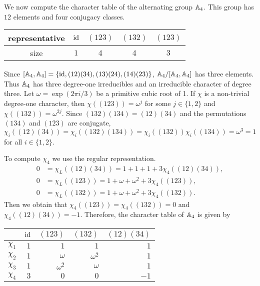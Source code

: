 \begin{example}
	We now compute the character table of the alternating group $\mathbb{A}_4$. This group has $12$ 
	elements and four conjugacy classes.
	\begin{center}
		\begin{tabular}{c|cccc}
			representative & $\operatorname{id}$ & $(123)$ & $(132)$ & $(123)$\tabularnewline
			\hline
			size & $1$ & $4$ & $4$ & $3$ 
		\end{tabular}
	\end{center}
	Since $[\mathbb{A}_4,\mathbb{A}_4]=\{\operatorname{id},(12)(34),(13)(24),(14)(23)\}$,
	$\mathbb{A}_4/[\mathbb{A}_4,\mathbb{A}_4]$ has three elements. Thus $\mathbb{A}_4$ has three degree-one irreducibles and
	an irreducible character of degree three. Let 
	$\omega=\exp(2\pi i/3)$ be a primitive cubic root of 1. If $\chi$
	is a non-trivial degree-one character, then 
	$\chi\left( (123) \right)=\omega^j$
	for some $j\in\{1,2\}$ and $\chi\left( (132) \right)=\omega^{2j}$. Since 
	$(132)(134)=(12)(34)$ and 
	the permutations $(134)$ and $(123)$ are conjugate,  
	\[
	\chi_i((12)(34))=\chi_i((132)(134))=\chi_i((132))\chi_i((134))=\omega^3=1
	\]
	for all $i\in\{1,2\}$. 
	
	To compute $\chi_4$ we use the regular representation. 
	\begin{align*}
		0&=\chi_L\left( (12)(34) \right)=1+1+1+3\chi_4\left( (12)(34) \right),\\
		0&=\chi_L\left( (123) \right)=1+\omega+\omega^2+3\chi_4\left( (123) \right),\\
		0&=\chi_L\left( (132) \right)=1+\omega+\omega^2+3\chi_4\left( (132) \right).
	\end{align*}
	Then we obtain that $\chi_4\left( (123) \right)=\chi_4\left( (132)
	\right)=0$ and $\chi_4\left( (12)(34) \right)=-1$. Therefore, the character table of $\mathbb{A}_4$
	is given by
	\begin{center}
		\begin{tabular}{|c|rrrr|}
			\hline
			& $\operatorname{id}$ & $(123)$ & $(132)$ & $(12)(34)$\tabularnewline
			\hline
			$\chi_1$ & $1$ & $1$ & $1$ & $1$\tabularnewline
			$\chi_2$ & $1$ & $\omega$ & $\omega^2$ & $1$\tabularnewline
			$\chi_3$ & $1$ & $\omega^2$ & $\omega$ & $1$\tabularnewline
			$\chi_4$ & $3$ & $0$ & $0$ & $-1$\tabularnewline
			\hline
		\end{tabular}
	\end{center}


\end{example}
